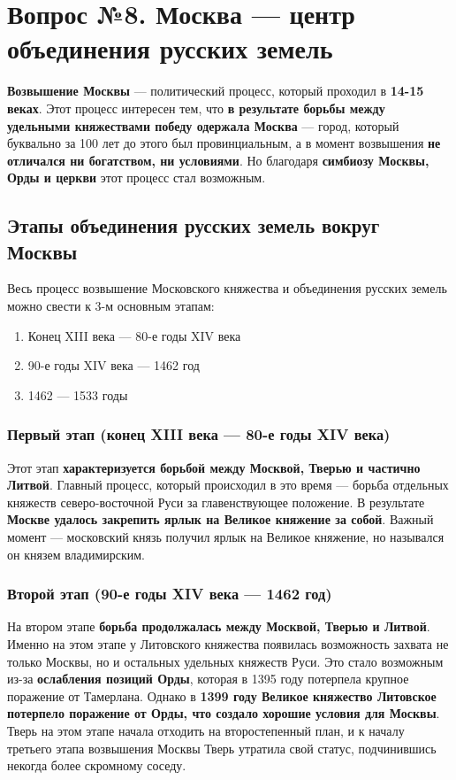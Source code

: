 \documentclass{article}
\begin{document}
\pagebreak
\section{Вопрос №8. Москва — центр объединения русских земель}

\textbf{Возвышение Москвы} — политический процесс, который проходил в \textbf{14-15 веках}. Этот процесс интересен тем, что \textbf{в результате борьбы между удельными княжествами победу одержала Москва} — город, который буквально за 100 лет до этого был провинциальным, а в момент возвышения \textbf{не отличался ни богатством, ни условиями}. Но благодаря \textbf{симбиозу Москвы, Орды и церкви} этот процесс стал возможным.

\subsection{Этапы объединения русских земель вокруг Москвы}

Весь процесс возвышение Московского княжества и объединения русских земель можно свести к 3-м основным этапам:

\begin{enumerate}
    \item Конец XIII века — 80-е годы XIV века
    \item 90-е годы XIV века — 1462 год
    \item 1462 — 1533 годы
\end{enumerate}

\subsubsection{Первый этап (конец XIII века — 80-е годы XIV века)}

Этот этап \textbf{характеризуется борьбой между Москвой, Тверью и частично Литвой}. Главный процесс, который происходил в это время — борьба отдельных княжеств северо-восточной Руси за главенствующее положение. В результате \textbf{Москве удалось закрепить ярлык на Великое княжение за собой}. Важный момент — московский князь получил ярлык на Великое княжение, но назывался он князем владимирским.

\subsubsection{Второй этап (90-е годы XIV века — 1462 год)}

На втором этапе \textbf{борьба продолжалась между Москвой, Тверью и Литвой}. Именно на этом этапе у Литовского княжества появилась возможность захвата не только Москвы, но и остальных удельных княжеств Руси. Это стало возможным из-за \textbf{ослабления позиций Орды}, которая в 1395 году потерпела крупное поражение от Тамерлана. Однако в \textbf{1399 году Великое княжество Литовское потерпело поражение от Орды, что создало хорошие условия для Москвы}. Тверь на этом этапе начала отходить на второстепенный план, и к началу третьего этапа возвышения Москвы Тверь утратила свой статус, подчинившись некогда более скромному соседу.
\end{document}
